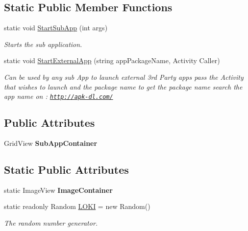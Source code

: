 \subsection*{Static Public Member Functions}
\begin{DoxyCompactItemize}
\item 
static void \hyperlink{class_w_c_c_mobile_1_1_main_activity_af8be63bdc0157ababa092069a770d679}{Start\+Sub\+App} (int args)
\begin{DoxyCompactList}\small\item\em Starts the sub application. \end{DoxyCompactList}\item 
static void \hyperlink{class_w_c_c_mobile_1_1_main_activity_a9ac2a808a8655ab4bab6de5a954f277f}{Start\+External\+App} (string app\+Package\+Name, Activity Caller)
\begin{DoxyCompactList}\small\item\em Can be used by any sub App to launch external 3rd Party apps pass the Activity that wishes to launch and the package name to get the package name search the app name on \+: \href{http://apk-dl.com/}{\tt http\+://apk-\/dl.\+com/} \end{DoxyCompactList}\end{DoxyCompactItemize}
\subsection*{Public Attributes}
\begin{DoxyCompactItemize}
\item 
Grid\+View {\bfseries Sub\+App\+Container}\hypertarget{class_w_c_c_mobile_1_1_main_activity_a8918397ea1a62b7847adb444381f63d0}{}\label{class_w_c_c_mobile_1_1_main_activity_a8918397ea1a62b7847adb444381f63d0}

\end{DoxyCompactItemize}
\subsection*{Static Public Attributes}
\begin{DoxyCompactItemize}
\item 
static Image\+View {\bfseries Image\+Container}\hypertarget{class_w_c_c_mobile_1_1_main_activity_a1f6b73d0f45d54348e90a3e42196f93b}{}\label{class_w_c_c_mobile_1_1_main_activity_a1f6b73d0f45d54348e90a3e42196f93b}

\item 
static readonly Random \hyperlink{class_w_c_c_mobile_1_1_main_activity_afcfd9d936ed9d4ebd09e620e7643bb2f}{L\+O\+KI} = new Random()
\begin{DoxyCompactList}\small\item\em The random number generator. \end{DoxyCompactList}\end{DoxyCompactItemize}
